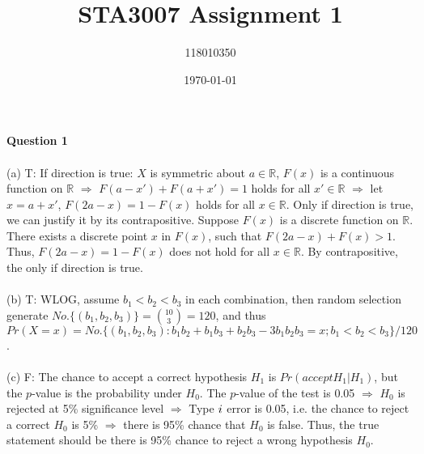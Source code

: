 \documentclass[12pt,a4paper]{article}
\begin{document}
	
\title{STA3007 Assignment 1}
\author{118010350}
\date{\today}
\maketitle	
	
\newpage

\textbf{Question 1}\\
~\\
(a) T: If direction is true: $X$ is symmetric about $a \in \mathbb{R}$, $F(x)$ is a continuous function on $\mathbb{R}$ $\Rightarrow$ $F(a-x')+F(a+x')=1$ holds for all $x' \in \mathbb{R}$ $\Rightarrow$ let $x=a+x'$, $F(2a-x)=1-F(x)$ holds for all $x \in \mathbb{R}$. Only if direction is true, we can justify it by its contrapositive. Suppose $F(x)$ is a discrete function on $\mathbb{R}$. There exists a discrete point $x$ in $F(x)$, such that $F(2a-x)+F(x)>1$. Thus, $F(2a-x)=1-F(x)$ does not hold for all $x \in \mathbb{R}$. By contrapositive, the only if direction is true.\\
~\\
(b) T: WLOG, assume $b_{1}<b_{2}<b_{3}$ in each combination, then random selection generate $No.\{(b_{1},b_{2},b_{3})\}={10 \choose 3}=120$, and thus $Pr(X=x)=No.\{(b_{1},b_{2},b_{3}):b_{1}b_{2}+b_{1}b_{3}+b_{2}b_{3}-3b_{1}b_{2}b_{3}=x;b_{1}<b_{2}<b_{3}\}/120$.\\
~\\
(c) F: The chance to accept a correct hypothesis $H_{1}$ is $Pr(accept H_{1}|H_{1} )$, but the $p$-value is the probability under $H_{0}$. The $p$-value of the test is 0.05 $\Rightarrow$ $H_{0}$ is rejected at 5\% significance level $\Rightarrow$ Type $\uppercase\expandafter{\romannumeral1}$ error is 0.05, i.e. the chance to reject a correct $H_{0}$ is 5\% $\Rightarrow$ there is 95\% chance that $H_{0}$ is false. Thus, the true statement should be there is 95\% chance to reject a wrong hypothesis $H_{0}$.
\end{document}
